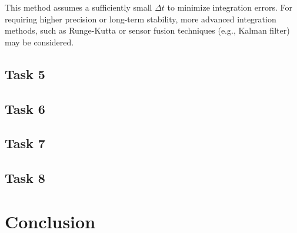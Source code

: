 \documentclass[12pt]{article}
\begin{document}
This method assumes a sufficiently small \(\Delta t\) to minimize integration errors. For requiring higher precision or long-term stability, more advanced integration methods, such as Runge-Kutta or sensor fusion techniques (e.g., Kalman filter) may be considered.


\subsection{Task 5}


\subsection{Task 6}


\subsection{Task 7}


\subsection{Task 8}

\section{Conclusion}






\appendix  
\clearpage
\addappheadtotoc 
\appendixpage 
\end{document}
